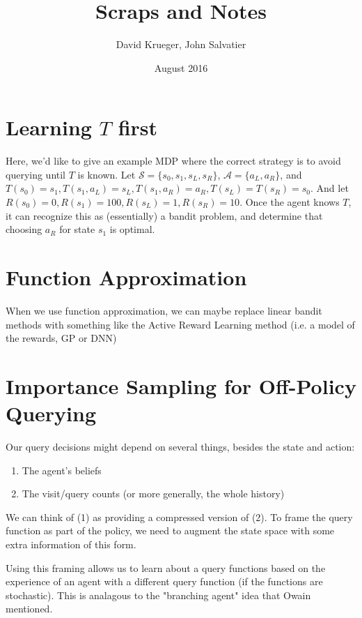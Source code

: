 \documentclass{article}
\title{Scraps and Notes}
\author{David Krueger, John Salvatier}
\date{August 2016}
\begin{document}
\maketitle


\section{Learning $T$ first}
Here, we'd like to give an example MDP where the correct strategy is to avoid querying until $T$ is known.
Let $\mathcal{S} = \{s_0,s_1,s_L, s_R\}$, $\mathcal{A} = \{a_L, a_R\}$, and $T(s_0) = s_1, T(s_1, a_L) = s_L, T(s_1, a_R) = a_R, T(s_L) = T(s_R) = s_0$.
And let $R(s_0) = 0, R(s_1) = 100, R(s_L) = 1, R(s_R) = 10$.
Once the agent knows $T$, it can recognize this as (essentially) a bandit problem, and determine that choosing $a_R$ for state $s_1$ is optimal.




\section{Function Approximation}
When we use function approximation, we can maybe replace linear bandit methods with something like the Active Reward Learning method (i.e. a model of the rewards, GP or DNN)

\section{Importance Sampling for Off-Policy Querying}
Our query decisions might depend on several things, besides the state and action:
\begin{enumerate}
\item The agent's beliefs
\item The visit/query counts (or more generally, the whole history)
\end{enumerate}

We can think of (1) as providing a compressed version of (2).  
To frame the query function as part of the policy, we need to augment the state space with some extra information of this form.

Using this framing allows us to learn about a query functions based on the experience of an agent with a different query function (if the functions are stochastic).
This is analagous to the "branching agent" idea that Owain mentioned.








%

\end{document}

